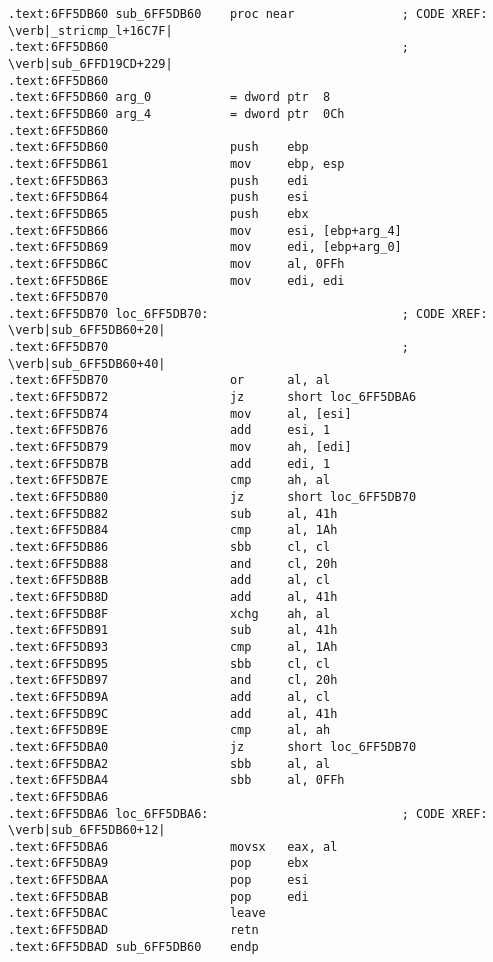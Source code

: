 \begin{lstlisting}[style=customasmx86]
.text:6FF5DB60 sub_6FF5DB60    proc near               ; CODE XREF: \verb|_stricmp_l+16C7F|
.text:6FF5DB60                                         ; \verb|sub_6FFD19CD+229|
.text:6FF5DB60
.text:6FF5DB60 arg_0           = dword ptr  8
.text:6FF5DB60 arg_4           = dword ptr  0Ch
.text:6FF5DB60
.text:6FF5DB60                 push    ebp
.text:6FF5DB61                 mov     ebp, esp
.text:6FF5DB63                 push    edi
.text:6FF5DB64                 push    esi
.text:6FF5DB65                 push    ebx
.text:6FF5DB66                 mov     esi, [ebp+arg_4]
.text:6FF5DB69                 mov     edi, [ebp+arg_0]
.text:6FF5DB6C                 mov     al, 0FFh
.text:6FF5DB6E                 mov     edi, edi
.text:6FF5DB70
.text:6FF5DB70 loc_6FF5DB70:                           ; CODE XREF: \verb|sub_6FF5DB60+20|
.text:6FF5DB70                                         ; \verb|sub_6FF5DB60+40|
.text:6FF5DB70                 or      al, al
.text:6FF5DB72                 jz      short loc_6FF5DBA6
.text:6FF5DB74                 mov     al, [esi]
.text:6FF5DB76                 add     esi, 1
.text:6FF5DB79                 mov     ah, [edi]
.text:6FF5DB7B                 add     edi, 1
.text:6FF5DB7E                 cmp     ah, al
.text:6FF5DB80                 jz      short loc_6FF5DB70
.text:6FF5DB82                 sub     al, 41h
.text:6FF5DB84                 cmp     al, 1Ah
.text:6FF5DB86                 sbb     cl, cl
.text:6FF5DB88                 and     cl, 20h
.text:6FF5DB8B                 add     al, cl
.text:6FF5DB8D                 add     al, 41h
.text:6FF5DB8F                 xchg    ah, al
.text:6FF5DB91                 sub     al, 41h
.text:6FF5DB93                 cmp     al, 1Ah
.text:6FF5DB95                 sbb     cl, cl
.text:6FF5DB97                 and     cl, 20h
.text:6FF5DB9A                 add     al, cl
.text:6FF5DB9C                 add     al, 41h
.text:6FF5DB9E                 cmp     al, ah
.text:6FF5DBA0                 jz      short loc_6FF5DB70
.text:6FF5DBA2                 sbb     al, al
.text:6FF5DBA4                 sbb     al, 0FFh
.text:6FF5DBA6
.text:6FF5DBA6 loc_6FF5DBA6:                           ; CODE XREF: \verb|sub_6FF5DB60+12|
.text:6FF5DBA6                 movsx   eax, al
.text:6FF5DBA9                 pop     ebx
.text:6FF5DBAA                 pop     esi
.text:6FF5DBAB                 pop     edi
.text:6FF5DBAC                 leave
.text:6FF5DBAD                 retn
.text:6FF5DBAD sub_6FF5DB60    endp


\end{lstlisting}
